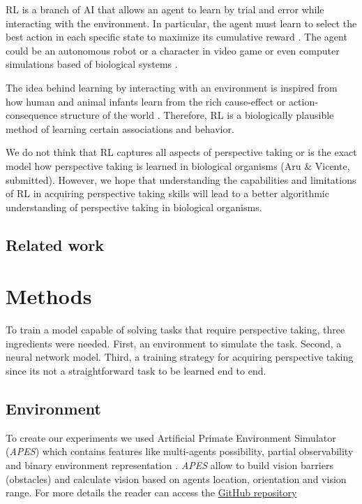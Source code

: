 \documentclass{article}
\begin{document}
RL is a branch of AI that allows an agent to learn by trial and error while interacting with the environment. In particular, the agent must learn to select the best action in each specific state to maximize its cumulative reward \cite{sutton1998reinforcement}. The agent could be an autonomous robot \cite{lin1993reinforcement,yang2004multiagent,riedmiller2009reinforcement} or a character in video game \cite{mnih2013playing,tampuu2017multiagent} or even computer simulations based of biological systems \cite{amigoni2007multiagent}. 

\par 
The idea behind learning by interacting with an environment is inspired from how human and animal infants learn from the rich cause-effect or action-consequence structure of the world \cite{sutton1998reinforcement,thorndike1911animal,schultz1997neural}. Therefore, RL is a biologically plausible method of learning certain associations and behavior. 

We do not think that RL captures all aspects of perspective taking or is the exact model how perspective taking is learned in biological organisms (Aru \& Vicente, submitted). However, we hope that understanding the capabilities and limitations of RL in acquiring perspective taking skills will lead to a better algorithmic understanding of perspective taking in biological organisms.
\subsection{Related work}

\section{Methods}
To train a model capable of solving tasks that require perspective taking, three ingredients were needed. First, an environment to simulate the task. Second, a neural network model. Third, a training strategy for acquiring perspective taking since its not a straightforward task to be learned end to end.
\subsection{Environment}
To create our experiments we used Artificial Primate Environment Simulator (\textit{APES}) which contains features like multi-agents possibility, partial observability and binary environment representation \cite{APES}. \textit{APES} allow to build vision barriers (obstacles) and calculate vision based on agents location, orientation and vision range. For more details the reader can access the \href{https://github.com/aqeel13932/APES}{GitHub repository}
\end{document}
